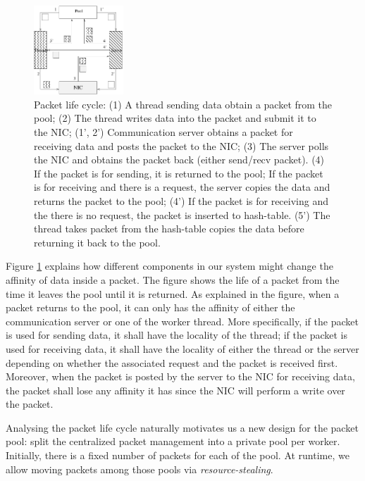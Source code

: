 \begin{figure}[t]
  \centering 
  \includegraphics[width=0.3\textwidth]{fig/packetlife.pdf}
  \caption{Packet life cycle: (1) A thread sending data obtain a packet from the
    pool; (2) The thread writes data into the packet and submit it to the NIC;
    (1', 2') Communication server obtains a packet for receiving data
    and posts the packet to the NIC;
    (3) The server polls the NIC and obtains the packet back (either send/recv packet).
    (4) If the packet is for sending, it is returned to the pool;
    If the packet is for receiving and there is a request, the server copies the data
    and returns the packet to the pool;
    (4') If the packet is for receiving and the there is no request, the packet is inserted to hash-table.
    (5') The thread takes packet from the hash-table copies the data before returning it back to the pool.}
  
  \label{fig:packetlife}
\end{figure}

Figure \ref{fig:packetlife} explains how different components in our system
might change the affinity of data inside a packet. The figure shows the life of
a packet from the time it leaves the pool until it is returned. As explained in
the figure, when a packet returns to the pool, it can only has the affinity
of either the communication server or one of the worker thread. More specifically,
if the packet is used for sending data, it shall have the locality of the thread;
if the packet is used for receiving data, it shall have the locality of either
the thread or the server depending on whether the associated request and the
packet is received first. Moreover, when the packet is posted by the server
to the NIC for receiving data, the packet shall lose any affinity it has since
the NIC will perform a write over the packet.

Analysing the packet life cycle naturally motivates us a new design for the
packet pool: split the centralized packet management into a private pool per
worker. Initially, there is a fixed number of packets for each of the pool. At
runtime, we allow moving packets among those pools via \textit{resource-stealing}.

